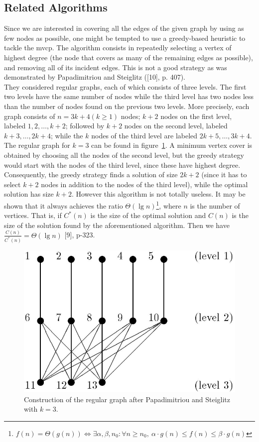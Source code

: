 \documentclass[12pt]{article}
\begin{document}
\subsection{Related Algorithms}
\label{sec:ra}
Since we are interested in covering all the edges of the
given graph by using as few nodes as possible, one might
be tempted to use a greedy-based heuristic to tackle the
mvcp. The algorithm consists in repeatedly selecting a
vertex of highest degree (the node that covers as many
of the remaining edges as possible), and removing all
of its incident edges. This is not a good strategy as
was demonstrated by Papadimitriou and Steiglitz ([10],
p. 407). \\
They considered regular graphs, each of which
consists of three levels. The first two levels have the same
number of nodes while the third level has two nodes less
than the number of nodes found on the previous two
levels. More precisely, each graph consists of $n = 3k + 4 (k \geq 1)$
nodes; $k+2$ nodes on the first level, labeled $1, 2, \dots, k+2$;
followed by $k+2$ nodes on the second level, labeled $k+3, \dots, 2k+4$;
while the $k$ nodes of the third level are labeled $2k+5, \dots, 3k+4$.
The regular graph for $k = 3$ can be found in figure~\ref{fig:ps}.
A minimum vertex cover is obtained by choosing all
the nodes of the second level, but the greedy strategy
would start with the nodes of the third level, since these
have highest degree. Consequently, the greedy strategy
finds a solution of size $2k + 2$ (since it has to select $k + 2$
nodes in addition to the nodes of the third level), while
the optimal solution has size $k + 2$.
However this algorithm is not totally useless. It may be shown that it always
achieves the ratio $\Theta(\lg n)$\footnote{$f(n) = \Theta(g(n)) \iff
\exists \alpha, \beta, n_0 : \forall n \geq n_0, \ 
\alpha \cdot g(n) \leq f(n) \leq \beta \cdot g(n)
$},
where $n$ is the number of vertices.
That is, if $C^*(n)$ is the size of the optimal
solution and $C(n)$ is the size of the solution found by the aforementioned
algorithm. Then we have $\frac{C(n)}{C^*(n)} = \Theta(\lg n)$ [9], p-323.

\begin{figure}[!htbp]
\centering
\includegraphics[width=1\textwidth]{ps}
\caption{Construction of the regular graph after Papadimitriou
and Steiglitz with $k=3$.}
\label{fig:ps}
\end{figure}
\end{document}

